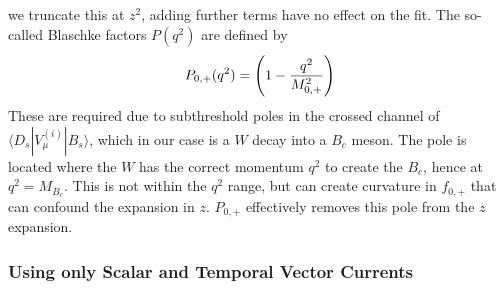 \documentclass[a4paper,10pt]{article}
\numberwithin{equation}{section}
\begin{document}
we truncate this at $z^2$, adding further terms have no effect on the fit. The so-called Blaschke factors $P(q^2)$
are defined by
\begin{align}
	P_{0,+}(q^2) = \left( 1 - {q^2\over M_{0,+}^2}\right)
\end{align}
These are required due to subthreshold poles in the crossed channel of $\langle D_s | V^{(i)}_{\mu} | B_s \rangle$, which in our case is a $W$ decay into a $B_c$ meson. The pole is located where the $W$ has the correct momentum $q^2$ to create the $B_c$, hence at $q^2=M_{B_c}$. This is not within the $q^2$ range, but can create curvature in $f_{0,+}$ that can confound the expansion in $z$. $P_{0,+}$ effectively removes this pole from the $z$ expansion.

\subsubsection{Using only Scalar and Temporal Vector Currents}
\end{document}
